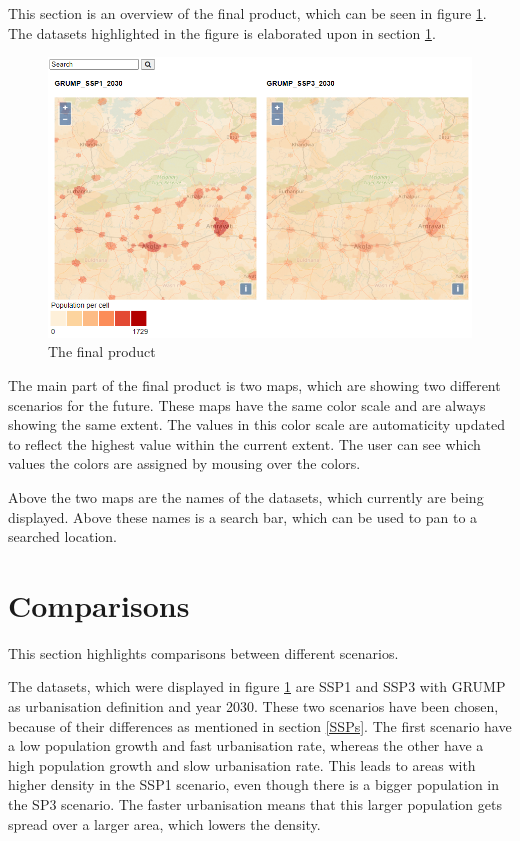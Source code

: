 This section is an overview of the final product, which can be seen in figure \ref{FinalProduct}. 
The datasets highlighted in the figure is elaborated upon in section \ref{Comparisons}.


\begin{figure} [H]
	\centering
	\includegraphics[width=.8\textwidth]{Pictures/FinalProduct}
	\caption{The final product}
	\label{FinalProduct}
\end{figure}

The main part of the final product is two maps, which are showing two different scenarios for the future. These maps have the same color scale and are always showing the same extent. The values in this color scale are automaticity updated to reflect the highest value within the current extent. The user can see which values the colors are assigned by mousing over the colors. 

Above the two maps are the names of the datasets, which currently are being displayed. Above these names is a search bar, which can be used to pan to a searched location.  
\section{Comparisons}\label{Comparisons}
This section highlights comparisons between different scenarios. 

The datasets, which were displayed in figure \ref{FinalProduct} are SSP1 and SSP3 with GRUMP as urbanisation definition and year 2030. These two scenarios have been chosen, because of their differences as mentioned in section \ref{SSPs}. The first scenario have a low population growth and fast urbanisation rate, whereas the other have a high population growth and slow urbanisation rate. This leads to areas with higher density in the SSP1 scenario, even though there is a bigger population in the SP3 scenario. The faster urbanisation means that this larger population gets spread over a larger area, which lowers the density.

